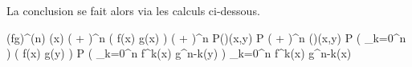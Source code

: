 La conclusion se fait alors via les calculs ci-dessous.

\begin{stepcalc}[style=ar*]
	(fg)^{(n)} (x)
\explnext{}
    \big(  +  \big)^n \big( f(x) g(x) \big)
\explnext{}
    \big(  +  \big)^n \circ P(\pi)(x,y)
    P \circ \big(  +  \big)^n (\pi)(x,y)
\explnext{}
    P \circ \big( \dsum_{k=0}^n \combi[n][k]  \circ {} \big) \big( f(x) g(y) \big)
%
%
\explnext{}
    P \circ \big( \dsum_{k=0}^n \combi[n][k] f^k(x) g^{n-k}(y) \big)
\explnext{}
	\dsum_{k=0}^n \combi[n][k] f^k(x) g^{n-k}(x)
\end{stepcalc}